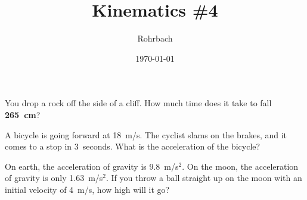\documentclass[10pt]{exam}
\title{Kinematics \#4}
\author{Rohrbach}
\date{\today}
\begin{document}
\maketitle

\printeqs

\begin{questions}
  \question  
    You drop a rock off the side of a cliff.  How much time does it take to fall {\bf 265~cm}?
    \vs
    
  \question
    A bicycle is going forward at 18~m/s.  The cyclist slams on the brakes, and it comes to a stop in 3~seconds.  What is the acceleration of the bicycle?
    \vs
  
  \question
    On earth, the acceleration of gravity is 9.8~m/s$^2$.  On the moon, the acceleration of gravity is only 1.63~m/s$^2$.  If you throw a ball straight up on the moon with an initial velocity of 4~m/s, how high will it go?
    \vs
  
    
  
\end{questions}
\end{document}
